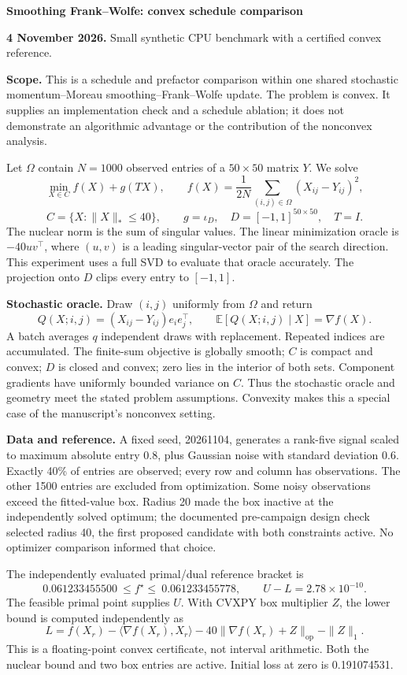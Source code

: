 \documentclass[10pt,a4paper]{article}
\newcommand{\pageheading}[1]{{\Large\bfseries #1}\par\vspace{3mm}}
\begin{document}
\pageheading{Smoothing Frank--Wolfe: convex schedule comparison}
\textbf{4 November 2026.} Small synthetic CPU benchmark with a certified convex reference.

\textbf{Scope.} This is a schedule and prefactor comparison within one shared stochastic momentum--Moreau smoothing--Frank--Wolfe update. The problem is convex. It supplies an implementation check and a schedule ablation; it does not demonstrate an algorithmic advantage or the contribution of the nonconvex analysis.

Let $\Omega$ contain $N=1000$ observed entries of a $50\times50$ matrix $Y$. We solve
\[
\min_{X\in C} f(X)+g(TX),\qquad
f(X)=\frac1{2N}\sum_{(i,j)\in\Omega}(X_{ij}-Y_{ij})^2,
\]
\[
C=\{X:\|X\|_*\le40\},\qquad g=\iota_D,\quad
D=[-1,1]^{50\times50},\quad T=I.
\]
The nuclear norm is the sum of singular values. The linear minimization oracle is $-40uv^\top$, where $(u,v)$ is a leading singular-vector pair of the search direction. This experiment uses a full SVD to evaluate that oracle accurately. The projection onto $D$ clips every entry to $[-1,1]$.

\textbf{Stochastic oracle.} Draw $(i,j)$ uniformly from $\Omega$ and return
\[
Q(X;i,j)=(X_{ij}-Y_{ij})e_ie_j^\top,\qquad
\mathbb E[Q(X;i,j)\mid X]=\nabla f(X).
\]
A batch averages $q$ independent draws with replacement. Repeated indices are accumulated. The finite-sum objective is globally smooth; $C$ is compact and convex; $D$ is closed and convex; zero lies in the interior of both sets. Component gradients have uniformly bounded variance on $C$. Thus the stochastic oracle and geometry meet the stated problem assumptions. Convexity makes this a special case of the manuscript's nonconvex setting.

\textbf{Data and reference.} A fixed seed, 20261104, generates a rank-five signal scaled to maximum absolute entry 0.8, plus Gaussian noise with standard deviation 0.6. Exactly 40\% of entries are observed; every row and column has observations. The other 1500 entries are excluded from optimization. Some noisy observations exceed the fitted-value box. Radius 20 made the box inactive at the independently solved optimum; the documented pre-campaign design check selected radius 40, the first proposed candidate with both constraints active. No optimizer comparison informed that choice.

The independently evaluated primal/dual reference bracket is
\[
0.061233455500\ \le f^\star\le\ 0.061233455778,
\qquad U-L=2.78\times10^{-10}.
\]
The feasible primal point supplies $U$. With CVXPY box multiplier $Z$, the lower bound is computed independently as
\[
L=f(X_r)-\langle\nabla f(X_r),X_r\rangle
-40\|\nabla f(X_r)+Z\|_{\mathrm{op}}-\|Z\|_1.
\]
This is a floating-point convex certificate, not interval arithmetic. Both the nuclear bound and two box entries are active. Initial loss at zero is 0.191074531.
\end{document}
